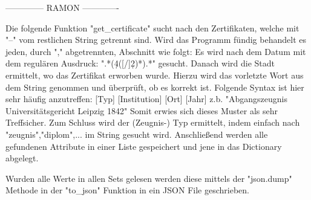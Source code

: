   -------------- RAMON -------------



 Die folgende Funktion "get_certificate" sucht nach den Zertifikaten, welche mit "--" vom restlichen String getrennt sind. Wird das Programm fündig behandelt es jeden, durch "," abgetrennten, Abschnitt wie folgt:
 Es wird nach dem Datum mit dem regulären Ausdruck: ".*(\d{4}([/]\d{2})*).*"  gesucht. Danach wird die Stadt ermittelt, wo das Zertifikat erworben wurde. Hierzu wird das vorletzte Wort aus dem String genommen und überprüft, ob es korrekt ist. Folgende Syntax ist hier sehr häufig anzutreffen: [Typ] [Institution] [Ort] [Jahr]
 z.b. "Abgangszeugnis Universitätsgericht Leipzig 1842"
 Somit erwies sich dieses Muster als sehr Treffsicher.
 Zum Schluss wird der (Zeugnis-) Typ ermittelt, indem einfach nach "zeugnis","diplom",... im String gesucht wird. Anschließend werden alle gefundenen Attribute in einer Liste gespeichert und jene in das Dictionary abgelegt.

 Wurden alle Werte in allen Sets gelesen werden diese mittels der "json.dump" Methode in der "to_json" Funktion in ein JSON File geschrieben.
